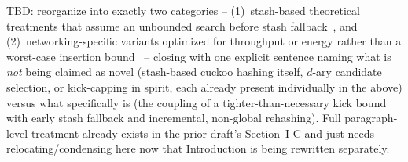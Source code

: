 \documentclass[conference]{IEEEtran}
\begin{document}
	TBD: reorganize into exactly two categories --
	(1)~stash-based theoretical treatments that assume an unbounded search
	before stash fallback~\cite{kirsch2009stash,kutzelnigg2010stash,aumuller2014explicit,fountoulakis2012sharp,noble2021explicit,minaud2023generalized,kuszmaul2025bubbling},
	and (2)~networking-specific variants optimized for throughput or
	energy rather than a worst-case insertion bound~\cite{pontarelli2016parallel,pontarelli2016cuckoocache,lescouarnec2018cuckoopp,xiong2025tecache,tripathi2026performance}
	-- closing with one explicit sentence naming what is \emph{not} being
	claimed as novel (stash-based cuckoo hashing itself, $d$-ary
	candidate selection, or kick-capping in spirit, each already present
	individually in the above) versus what specifically is (the coupling
	of a tighter-than-necessary kick bound with early stash fallback and
	incremental, non-global rehashing). Full paragraph-level treatment
	already exists in the prior draft's Section~I-C and just needs
	relocating/condensing here now that Introduction is being rewritten
	separately.
	
	
	
	
	
\end{document}
